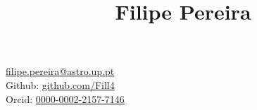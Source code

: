 \documentclass[letterpaper,10pt,oneside]{article}
\newcommand{\CVAuthor}{Filipe Pereira}
\newcommand{\CVTitle}{Curriculum Vit\ae}
\newcommand{\CVWebpage}{}
\begin{document}

\title{\CVAuthor}

\begin{subtitle}

\par
\GapNoBreak
\href{mailto:filipe.pereira@astro.up.pt}{filipe.pereira@astro.up.pt} \\
Github: \href{https://github.com/Fill4}{github.com/Fill4} \\ 
Orcid: \href{https://orcid.org/0000-0002-2157-7146}{0000-0002-2157-7146}
\end{subtitle}
\end{document}

